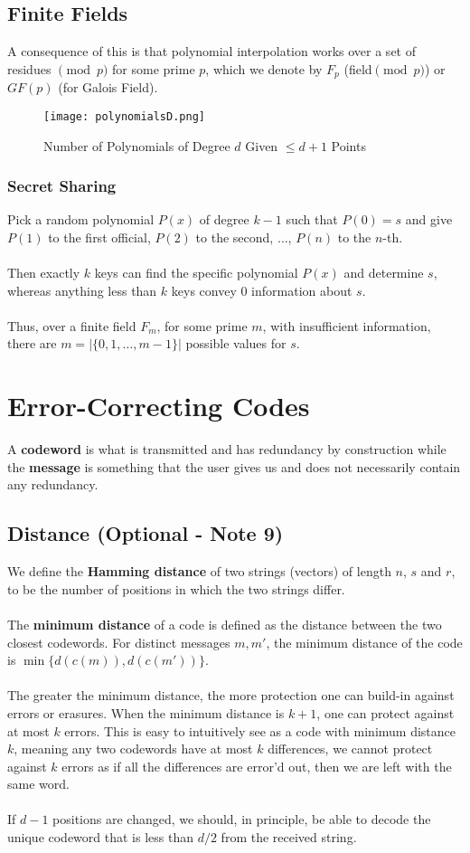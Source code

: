 \documentclass{article}
\theoremstyle{definition}
\begin{document}
\subsection*{Finite Fields}
A consequence of this is that polynomial interpolation works over a set of residues $\pmod{p}$ for some prime $p$, which we denote by $F_p$ (field$\pmod{p}$) or $GF(p)$ (for Galois Field).
\begin{figure}[H]
\begin{center}
\texttt{[image: polynomialsD.png]}
\caption{Number of Polynomials of Degree $d$ Given $\leq d + 1$ Points}
\end{center}
\end{figure}
\subsubsection*{Secret Sharing}
Pick a random polynomial $P(x)$ of degree $k - 1$ such that $P(0) = s$ and give $P(1)$ to the first official, $P(2)$ to the second, $\dots$, $P(n)$ to the $n$-th. \\ \\
Then exactly $k$ keys can find the specific polynomial $P(x)$ and determine $s$, whereas anything less than $k$ keys convey 0 information about $s$. \\ \\
Thus, over a finite field $F_m$, for some prime $m$, with insufficient information, there are $m = |\{0, 1, \dots, m - 1\}|$ possible values for $s$.
\section*{Error-Correcting Codes}
A \textbf{codeword} is what is transmitted and has redundancy by construction while the \textbf{message} is something that the user gives us and does not necessarily contain any redundancy.
\subsection*{Distance (Optional - Note 9)}
We define the \textbf{Hamming distance} of two strings (vectors) of length $n$, $s$ and $r$, to be the number of positions in which the two strings differ. \\ \\
The \textbf{minimum distance} of a code is defined as the distance between the two closest codewords. For distinct messages $m, m'$, the minimum distance of the code is $\min \{ d(c(m)), d(c(m')) \}$. \\ \\
The greater the minimum distance, the more protection one can build-in against errors or erasures. When the minimum distance is $k + 1$, one can protect against at most $k$ errors. This is easy to intuitively see as a code with minimum distance $k$, meaning any two codewords have at most $k$ differences, we cannot protect against $k$ errors as if all the differences are error'd out, then we are left with the same word. \\ \\
If $d - 1$ positions are changed, we should, in principle, be able to decode the unique codeword that is less than $d/2$ from the received string.
\end{document}
